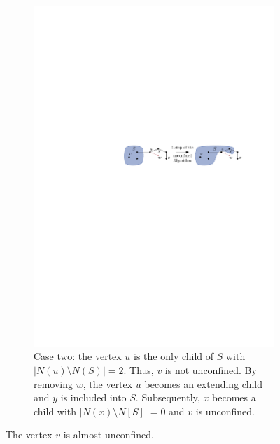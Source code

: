\documentclass[12pt,a4paper,twoside]{scrartcl}
\numberwithin{equation}{section}
\begin{document}
\begin{figure}[htb]
\begin{subfigure}{\textwidth}
		\includegraphics[scale=1.5]{images/alm_unconf_2}
		\caption{Case two: the vertex $u$ is the only child of $S$ with $|N(u) \setminus N(S)| = 2$. Thus, $v$ is not unconfined. By removing $w$, the vertex $u$ becomes an extending child and $y$ is included into $S$. Subsequently, $x$ becomes a child with $|N(x)\setminus N[S]| = 0$ and $v$ is unconfined.}
	\end{subfigure}
	\caption{The vertex $v$ is almost unconfined.}
\end{figure}
\end{document}
